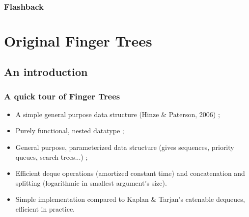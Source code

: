 


\begin{frame}[plain]
  \titlepage
  \vfill\hfill
  ~
  ~
\end{frame}

\begin{frame}[plain]
  \frametitle{Flashback}
\end{frame}

\frame{\tableofcontents}

\section{Original Finger Trees}

\subsection{An introduction}
\begin{frame}
  \frametitle{A quick tour of Finger Trees}
  
  \begin{itemize}
  \item A simple general purpose data structure (Hinze \& Paterson, 2006) ;
  \item Purely functional, nested datatype ;
  \item General purpose, parameterized data structure (gives sequences,
    priority queues, search trees...) ;
  \item Efficient deque operations (amortized constant time) and
    concatenation and splitting (logarithmic in smallest argument's
    size).
  \item Simple implementation compared to Kaplan \& Tarjan's
    catenable dequeues, efficient in practice.
  \end{itemize}
  
\end{frame}

